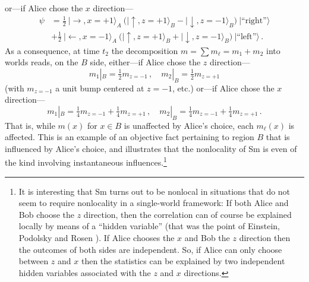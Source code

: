 \documentclass[12pt]{article}
\begin{document}
or---if Alice chose the $x$ direction---
\begin{align}
\psi& = \nonumber
\tfrac{1}{2} \: \bigl|\rightarrow,x=+1\bigr\rangle_A \: 
\bigl(\bigl|\uparrow,z=+1\bigr\rangle_B - \bigl|\downarrow,z=-1\bigr\rangle_B\bigr)
\: \bigl|\text{``right''}\bigr\rangle \\%
&+ \tfrac{1}{2} \: \bigl|\leftarrow,x=-1\bigr\rangle_A \: 
\bigl(\bigl| \uparrow,z=+1 \bigr\rangle_B + \bigl|\downarrow,z=-1\bigr\rangle_B\bigr)
\: \bigl|\text{``left''}\bigr\rangle\,.
\end{align}
As a consequence, at time $t_2$ the decomposition $m=\sum m_\ell = m_1+m_2$ into worlds reads, on the $B$ side, either---if Alice chose the $z$ direction---
\begin{equation}
m_1|_B = \tfrac{1}{2} m_{z=-1}\,,\quad m_2|_B = \tfrac{1}{2} m_{z=+1} 
\end{equation}
(with $m_{z=-1}$ a unit bump centered at $z=-1$, etc.)
or---if Alice chose the $x$ direction---
\begin{equation}
m_1|_B = \tfrac{1}{4} m_{z=-1} + \tfrac{1}{4} m_{z=+1}\,,\quad 
m_2|_B = \tfrac{1}{4} m_{z=-1} + \tfrac{1}{4} m_{z=+1}\,. 
\end{equation}
That is, while $m(x)$ for $x\in B$ is unaffected by Alice's choice, each $m_\ell(x)$ is affected. This is an example of an objective fact pertaining to region $B$ that is influenced by Alice's choice, and illustrates that the nonlocality of Sm is even of the kind involving instantaneous influences.\footnote{It is interesting that Sm turns out to be nonlocal in situations that do not seem to require nonlocality in a single-world framework: If both Alice and Bob choose the $z$ direction, then the correlation can of course be explained locally by means of a ``hidden variable'' (that was the point of Einstein, Podolsky and Rosen \cite{EPR35}). If Alice chooses the $x$ and Bob the $z$ direction then the outcomes of both sides are independent. So, if Alice can only choose between $z$ and $x$ then the statistics can be explained by two independent hidden variables associated with the $z$ and $x$ directions.}
\end{document}
